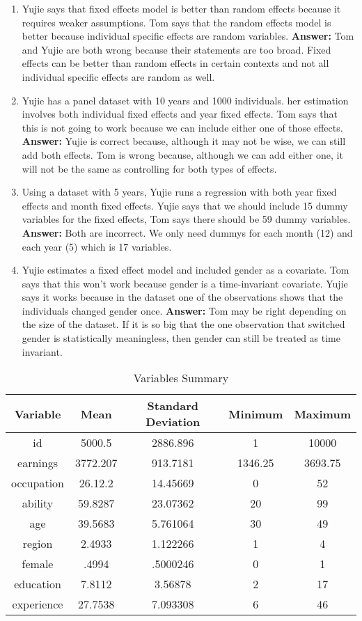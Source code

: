 \documentclass[11pt]{SelfArxOneColBMN}
\begin{document}
\begin{enumerate}
\begin{enumerate}
    \item Yujie says that fixed effects model is better than random effects because it requires weaker assumptions. Tom says that the random effects model is better because individual specific effects are random variables.
    \textbf{Answer: }Tom and Yujie are both wrong because their statements are too broad. Fixed effects can be better than random effects in certain contexts and not all individual specific effects are random as well.
    \item Yujie has a panel dataset with 10 years and 1000 individuals. her estimation involves both individual fixed effects and year fixed effects. Tom says that this is not going to work because we can include either one of those effects.
    \textbf{Answer: }Yujie is correct because, although it may not be wise, we can still add both effects. Tom is wrong because, although we can add either one, it will not be the same as controlling for both types of effects. 
    \item Using a dataset with 5 years, Yujie runs a regression with both year fixed effects and month fixed effects. Yujie says that we should include 15 dummy variables for the fixed effects, Tom says there should be 59 dummy variables.
    \textbf{Answer: }Both are incorrect.  We only need dummys for each month (12) and each year (5) which is 17 variables.
    \item Yujie estimates a fixed effect model and included gender as a covariate. Tom says that this won't work because gender is a time-invariant covariate. Yujie says it works because in the dataset one of the observations shows that the individuals changed gender once.
    \textbf{Answer: }Tom may be right depending on the size of the dataset. If it is so big that the one observation that switched gender is statistically meaningless, then gender can still be treated as time invariant.
  \end{enumerate}
\end{enumerate}

\newpage
\begin{table*}
  \centering
  \caption{Variables Summary}
  \begin{tabular}{|c|c|c|c|c|}
    \hline
    Variable & Mean & Standard Deviation & Minimum & Maximum\\
    \hline
    id & 5000.5 & 2886.896 & 1 & 10000\\
    earnings & 3772.207 & 913.7181 & 1346.25 & 3693.75\\
    occupation & 26.12.2 & 14.45669 & 0 & 52\\
    ability & 59.8287 & 23.07362 & 20 & 99\\
    age & 39.5683 & 5.761064 & 30 & 49\\
    region & 2.4933 & 1.122266 & 1 & 4\\
    female & .4994 & .5000246 & 0 & 1\\
    education & 7.8112 & 3.56878 & 2 & 17\\
    experience & 27.7538 & 7.093308 & 6 & 46\\
    \hline
  \end{tabular}
  \label{tab:1}
\end{table*}

\begin{landscape}

\end{landscape}


\end{document}
